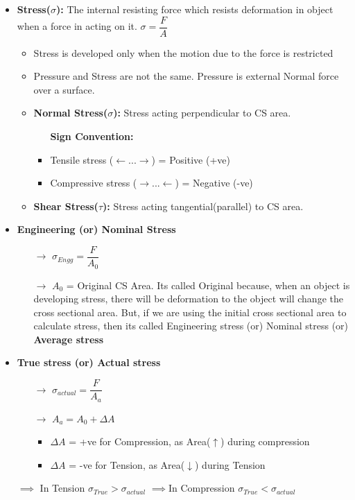 \documentclass[8pt]{article}
\begin{document}
	\begin{itemize}
		\item \textbf{Stress($\sigma$): }The internal resisting force which resists deformation in object when a force in acting on it. $\sigma = \dfrac{F}{A}$
		\begin{itemize}
			\item Stress is developed only when the motion due to the force is restricted
			\item Pressure and Stress are not the same. Pressure is external Normal force over a surface. 
			\item \textbf{Normal Stress($\sigma$): }Stress acting perpendicular to CS area.
				\begin{itemize}
					\item[] \textbf{Sign Convention:}
					\item Tensile stress ($\leftarrow\boxed{...}\rightarrow$) = Positive (+ve)
					\item Compressive stress ($\rightarrow\boxed{...}\leftarrow$) = Negative (-ve)
				\end{itemize}
			\item \textbf{Shear Stress($\tau$): }Stress acting tangential(parallel) to CS area.
		\end{itemize}
		\item \textbf{Engineering (or) Nominal Stress}
			\begin{itemize}
				\item[$\rightarrow$] $\boxed{\sigma_{Engg}=\dfrac{F}{A_0}}$
				\item[$\rightarrow$] $A_0$ = Original CS Area. Its called Original because, when an object is developing stress, there will be deformation to the object will change the cross sectional area. But, if we are using the initial cross sectional area to calculate stress, then its called Engineering stress (or) Nominal stress (or) \textbf{Average stress}
			\end{itemize}
		\item \textbf{True stress (or) Actual stress}
			\begin{itemize}
				\item[$\rightarrow$] $\boxed{\sigma_{actual} = \dfrac{F}{A_a}}$
				\item[$\rightarrow$] $A_a = A_0 + \Delta A$
					\begin{itemize}
						\item $\Delta A$ = +ve for Compression, as Area($\uparrow$) during compression
						\item $\Delta A$ = -ve for Tension, as Area($\downarrow$) during Tension
					\end{itemize}
			\end{itemize}
		\item[$\implies$] In Tension $\boxed{\sigma_{True} > \sigma_{actual}}$  \hspace{1cm}$\implies$In Compression $\boxed{\sigma_{True} < \sigma_{actual}}$ 
	\end{itemize}\hrulefill\\\\
\end{document}
